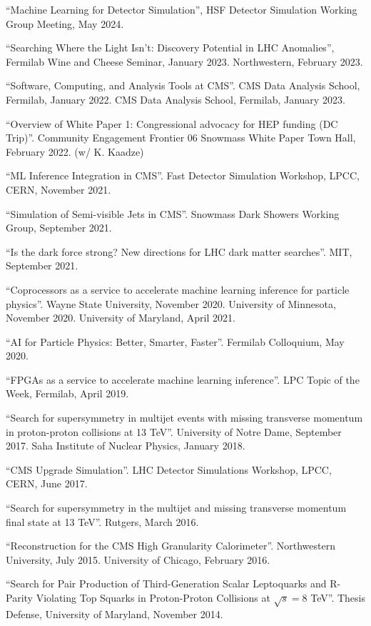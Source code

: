\begin{description}[leftmargin=12pt,font=\normalfont,labelsep=0em]
\item ``Machine Learning for Detector Simulation'', HSF Detector Simulation Working Group Meeting, May 2024.
\item ``Searching Where the Light Isn't: Discovery Potential in LHC Anomalies'', Fermilab Wine and Cheese Seminar, January 2023. Northwestern, February 2023.
\item ``Software, Computing, and Analysis Tools at CMS''. CMS Data Analysis School, Fermilab, January 2022. CMS Data Analysis School, Fermilab, January 2023.
\item ``Overview of White Paper 1: Congressional advocacy for HEP funding (DC Trip)''. Community Engagement Frontier 06 Snowmass White Paper Town Hall, February 2022. (w/ K. Kaadze)
\item ``ML Inference Integration in CMS''. Fast Detector Simulation Workshop, LPCC, CERN, November 2021.
\item ``Simulation of Semi-visible Jets in CMS''. Snowmass Dark Showers Working Group, September 2021.
\item ``Is the dark force strong? New directions for LHC dark matter searches''. MIT, September 2021.
\item ``Coprocessors as a service to accelerate machine learning inference for particle physics''. Wayne State University, November 2020. University of Minnesota, November 2020. University of Maryland, April 2021.
\item ``AI for Particle Physics: Better, Smarter, Faster''. Fermilab Colloquium, May 2020.
\item ``FPGAs as a service to accelerate machine learning inference''. LPC Topic of the Week, Fermilab, April 2019.
\item ``Search for supersymmetry in multijet events with missing transverse momentum in proton-proton collisions at 13 TeV''. University of Notre Dame, September 2017. Saha Institute of Nuclear Physics, January 2018.
\item ``CMS Upgrade Simulation''. LHC Detector Simulations Workshop, LPCC, CERN, June 2017.
\item ``Search for supersymmetry in the multijet and missing transverse momentum final state at 13 TeV''. Rutgers, March 2016.
\item ``Reconstruction for the CMS High Granularity Calorimeter''. Northwestern University, July 2015. University of Chicago, February 2016.
\item ``Search for Pair Production of Third-Generation Scalar Leptoquarks and R-Parity Violating Top Squarks in Proton-Proton Collisions at $\sqrt{s}=8$ TeV''. Thesis Defense, University of Maryland, November 2014.

\end{description}
